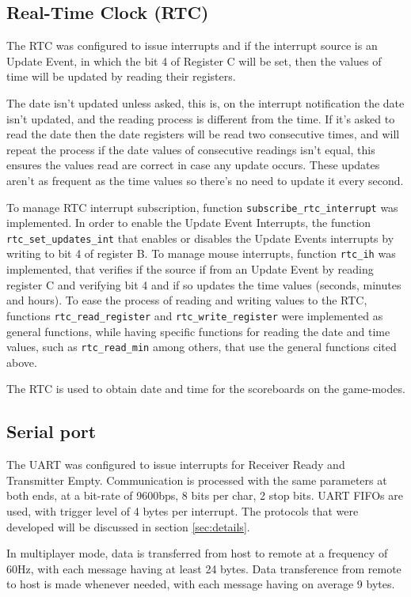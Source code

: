 \documentclass{article}
\theoremstyle{remark}
\begin{document}
\subsection{Real-Time Clock (RTC)}
The RTC was configured to issue interrupts and if the interrupt source is an Update Event, in which the bit 4 of Register C will be set, then the values of time will be updated by reading their registers.\par
The date isn't updated unless asked, this is, on the interrupt notification the date isn't updated, and the reading process is different from the time. If it's asked to read the date then the date registers will be read two consecutive times, and will repeat the process if the date values of consecutive readings isn't equal, this ensures the values read are correct in case any update occurs. These updates aren't as frequent as the time values so there's no need to update it every second.\par
To manage RTC interrupt subscription, function \texttt{subscribe\_rtc\_interrupt} was implemented. In order to enable the Update Event Interrupts, the function \texttt{rtc\_set\_updates\_int} that enables or disables the Update Events interrupts by writing to bit 4 of register B. To manage mouse interrupts, function \texttt{rtc\_ih} was implemented, that verifies if the source if from an Update Event by reading register C and verifying bit 4 and if so updates the time values (seconds, minutes and hours). To ease the process of reading and writing values to the RTC, functions \texttt{rtc\_read\_register} and \texttt{rtc\_write\_register} were implemented as general functions, while having specific functions for reading the date and time values, such as \texttt{rtc\_read\_min} among others, that use the general functions cited above.\par
The RTC is used to obtain date and time for the scoreboards on the game-modes.

\subsection{Serial port}
The UART was configured to issue interrupts for Receiver Ready and Transmitter Empty. Communication is processed with the same parameters at both ends, at a bit-rate of 9600bps, 8 bits per char, 2 stop bits. UART FIFOs are used, with  trigger level of 4 bytes per interrupt. The protocols that were developed will be discussed in section \ref{sec:details}. \par
In multiplayer mode, data is transferred from host to remote at a frequency of 60Hz, with each message having at least 24 bytes. Data transference from remote to host is made whenever needed, with each message having on average 9 bytes.
\pagebreak
\end{document}
